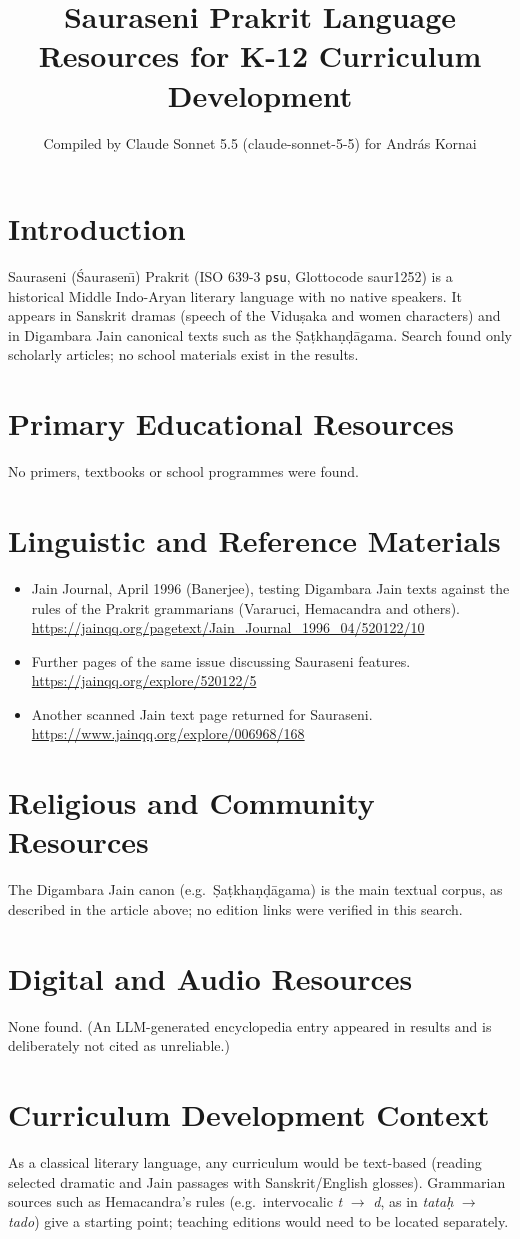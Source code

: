 \documentclass[12pt]{article}
\title{Sauraseni Prakrit Language Resources for K-12 Curriculum Development}
\author{Compiled by Claude Sonnet 5.5 (claude-sonnet-5-5) for Andr\'as Kornai}
\date{}
\begin{document}
\maketitle

\section{Introduction}
Sauraseni (\'Saurasen\={\i}) Prakrit (ISO 639-3 \texttt{psu}, Glottocode saur1252) is a historical Middle Indo-Aryan literary language with no native speakers. It appears in Sanskrit dramas (speech of the Vidu\d{s}aka and women characters) and in Digambara Jain canonical texts such as the \d{S}a\d{t}kha\d{n}\d{d}\=agama. Search found only scholarly articles; no school materials exist in the results.

\section{Primary Educational Resources}
No primers, textbooks or school programmes were found.

\section{Linguistic and Reference Materials}
\begin{itemize}
\item Jain Journal, April 1996 (Banerjee), testing Digambara Jain texts against the rules of the Prakrit grammarians (Vararuci, Hemacandra and others). \url{https://jainqq.org/pagetext/Jain_Journal_1996_04/520122/10}
\item Further pages of the same issue discussing Sauraseni features. \url{https://jainqq.org/explore/520122/5}
\item Another scanned Jain text page returned for Sauraseni. \url{https://www.jainqq.org/explore/006968/168}
\end{itemize}

\section{Religious and Community Resources}
The Digambara Jain canon (e.g.\ \d{S}a\d{t}kha\d{n}\d{d}\=agama) is the main textual corpus, as described in the article above; no edition links were verified in this search.

\section{Digital and Audio Resources}
None found. (An LLM-generated encyclopedia entry appeared in results and is deliberately not cited as unreliable.)

\section{Curriculum Development Context}
As a classical literary language, any curriculum would be text-based (reading selected dramatic and Jain passages with Sanskrit/English glosses). Grammarian sources such as Hemacandra's rules (e.g.\ intervocalic \emph{t} $\to$ \emph{d}, as in \emph{tata\d{h}} $\to$ \emph{tado}) give a starting point; teaching editions would need to be located separately.
\end{document}
